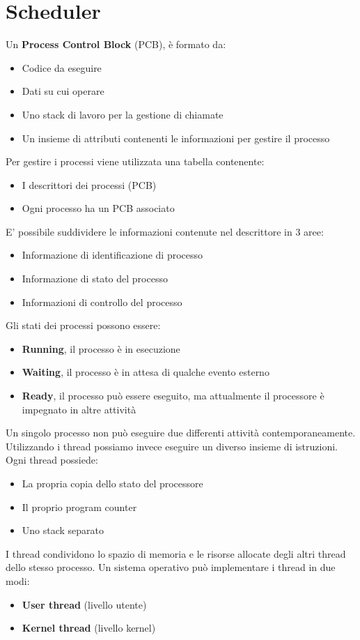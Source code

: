 \documentclass{article}
\begin{document}
\section{Scheduler}
Un \textbf{Process Control Block} (PCB), è formato da:
\begin{itemize}
  \item Codice da eseguire
  \item Dati su cui operare
  \item Uno stack di lavoro per la gestione di chiamate
  \item Un insieme di attributi contenenti le informazioni per gestire il processo
\end{itemize}
Per gestire i processi viene utilizzata una tabella contenente:
\begin{itemize}
  \item I descrittori dei processi (PCB)
  \item Ogni processo ha un PCB associato
\end{itemize}
E' possibile suddividere le informazioni contenute nel descrittore in $3$ aree:
\begin{itemize}
  \item Informazione di identificazione di processo
  \item Informazione di stato del processo
  \item Informazioni di controllo del processo
\end{itemize}

Gli stati dei processi possono essere:
\begin{itemize}
  \item \textbf{Running}, il processo è in esecuzione
  \item \textbf{Waiting}, il processo è in attesa di qualche evento esterno
  \item \textbf{Ready}, il processo può essere eseguito, ma attualmente il processore è impegnato in altre attività
\end{itemize} 
Un singolo processo non può eseguire due differenti attività contemporaneamente. Utilizzando i thread possiamo invece eseguire un diverso insieme di istruzioni. Ogni thread possiede:
\begin{itemize}
  \item La propria copia dello stato del processore
  \item Il proprio program counter
  \item Uno stack separato
\end{itemize}
I thread condividono lo spazio di memoria e le risorse allocate 
degli altri thread dello stesso processo. Un sistema operativo può implementare i thread in due modi:
\begin{itemize}
  \item \textbf{User thread} (livello utente)
  \item \textbf{Kernel thread} (livello kernel)
\end{itemize}
\end{document}
